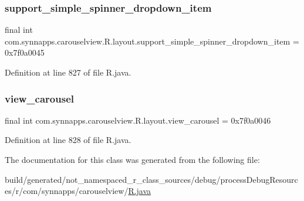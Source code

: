 \subsubsection{\texorpdfstring{support\_simple\_spinner\_dropdown\_item}{support\_simple\_spinner\_dropdown\_item}}
{\footnotesize\ttfamily final int com.\+synnapps.\+carouselview.\+R.\+layout.\+support\+\_\+simple\+\_\+spinner\+\_\+dropdown\+\_\+item = 0x7f0a0045\hspace{0.3cm}{\ttfamily [static]}}



Definition at line 827 of file R.\+java.

\mbox{\label{classcom_1_1synnapps_1_1carouselview_1_1_r_1_1layout_a6d9537890b32e70686d76cdbb4712975}} 
\subsubsection{\texorpdfstring{view\_carousel}{view\_carousel}}
{\footnotesize\ttfamily final int com.\+synnapps.\+carouselview.\+R.\+layout.\+view\+\_\+carousel = 0x7f0a0046\hspace{0.3cm}{\ttfamily [static]}}



Definition at line 828 of file R.\+java.



The documentation for this class was generated from the following file\+:\begin{DoxyCompactItemize}
\item 
build/generated/not\+\_\+namespaced\+\_\+r\+\_\+class\+\_\+sources/debug/process\+Debug\+Resources/r/com/synnapps/carouselview/\mbox{\hyperlink{com_2synnapps_2carouselview_2_r_8java}{R.\+java}}\end{DoxyCompactItemize}
